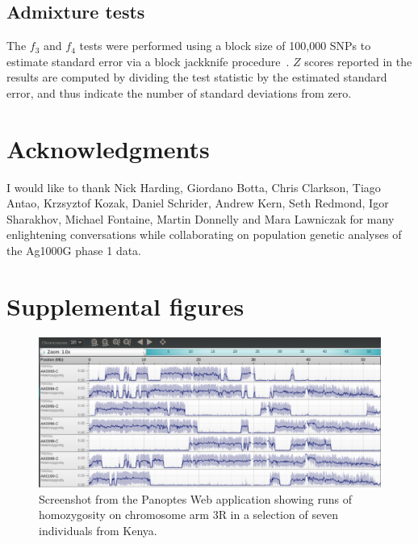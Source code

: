 \begin{refsection}
\subsection{Admixture tests}\label{subsec:methods-admixture}


The $f_3$ and $f_4$ tests were performed using a block size of 100,000 SNPs to estimate standard error via a block jackknife procedure~\parencite{Patterson2012}.
%
$Z$ scores reported in the results are computed by dividing the test statistic by the estimated standard error, and thus indicate the number of standard deviations from zero.


\section{Acknowledgments}\label{sec:ch4-acknowledgments}


I would like to thank Nick Harding, Giordano Botta, Chris Clarkson, Tiago Antao, Krzsyztof Kozak, Daniel Schrider, Andrew Kern, Seth Redmond, Igor Sharakhov, Michael Fontaine, Martin Donnelly and Mara Lawniczak for many enlightening conversations while collaborating on population genetic analyses of the Ag1000G phase 1 data.


\clearpage
\section{Supplemental figures}\label{sec:ch4-supplemental-figures}


\begin{figure}[h!]
\centering
\includegraphics[width=1.1\textwidth,center]{artwork/chapter4/keroh.pdf}
\caption{Screenshot from the Panoptes Web application showing runs of homozygosity on chromosome arm 3R in a selection of seven individuals from Kenya.
%
}
\label{fig:keroh}
\end{figure}



\end{refsection}
